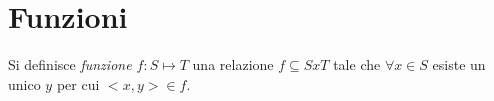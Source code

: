 \chapter{Funzioni}
Si definisce \textit{funzione $f:S \mapsto T$} una relazione $f \subseteq SxT$ tale che $\forall x \in S$
esiste un unico $y$ per cui $<x,y> \in f$.
